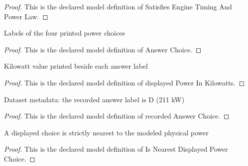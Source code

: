 \begin{proof}
  This is the declared model definition of Satisfies Engine Timing And Power Law.
\end{proof}
\begin{definition}
  \label{def:physics:phyx-mini-0438:phyxminiproblems-problemphyxmini0438-answerchoice}
  Labels of the four printed power choices
\end{definition}
\begin{proof}
  This is the declared model definition of Answer Choice.
\end{proof}
\begin{definition}
  \label{def:physics:phyx-mini-0438:phyxminiproblems-problemphyxmini0438-displayedpowerinkilowatts}
  Kilowatt value printed beside each answer label
\end{definition}
\begin{proof}
  This is the declared model definition of displayed Power In Kilowatts.
\end{proof}
\begin{definition}
  \label{def:physics:phyx-mini-0438:phyxminiproblems-problemphyxmini0438-recordedanswerchoice}
  Dataset metadata: the recorded answer label is D (211 kW)
\end{definition}
\begin{proof}
  This is the declared model definition of recorded Answer Choice.
\end{proof}
\begin{definition}
  \label{def:physics:phyx-mini-0438:phyxminiproblems-problemphyxmini0438-isnearestdisplayedpowerchoice}
  A displayed choice is strictly nearest to the modeled physical power
\end{definition}
\begin{proof}
  This is the declared model definition of Is Nearest Displayed Power Choice.
\end{proof}
